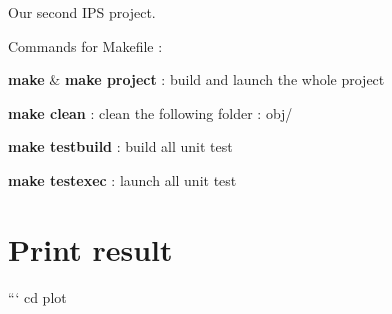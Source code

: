 Our second I\+PS project.

Commands for Makefile \+:
\begin{DoxyItemize}
\item {\bfseries make} \& {\bfseries make project} \+: build and launch the whole project
\item {\bfseries make clean} \+: clean the following folder \+: obj/
\item {\bfseries make testbuild} \+: build all unit test
\item {\bfseries make testexec} \+: launch all unit test
\end{DoxyItemize}

\section*{Print result}

``` cd plot 